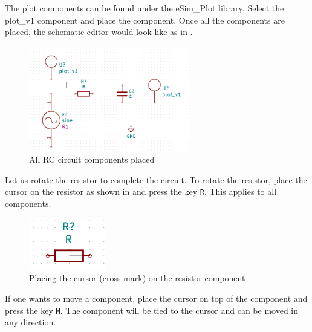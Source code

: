 The plot components can be found under the eSim\_Plot library. Select the plot\_v1 component and place the component. Once all the components are placed, the schematic editor would look like as in .
\begin{figure}[h]
\centering
\includegraphics[width=0.63\textwidth]{manual_images/afterplace.png}
\caption{All RC circuit components placed}
\label{afterplace}
\end{figure} 

Let us rotate the resistor to complete the circuit. To rotate the resistor, place the cursor on the resistor as shown in  and press the key {\tt R}. This applies to all components.

\begin{figure}[h]
\centering
\includegraphics[width=0.3\textwidth]{manual_images/rotate.png}
\caption{Placing the cursor (cross mark) on the resistor component} 
\label{rotate}
\end{figure}

If one wants to move a component, place the cursor on top of the
component and press the key {\tt M}. The component will be tied to the
cursor and can be moved in any direction.  


